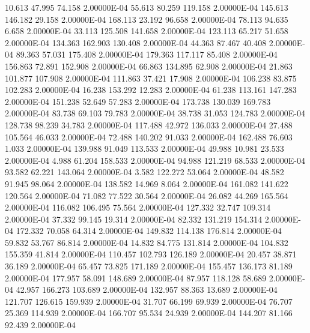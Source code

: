     10.613    47.995    74.158  2.00000E-04
    55.613    80.259   119.158  2.00000E-04
   145.613   146.182    29.158  2.00000E-04
   168.113    23.192    96.658  2.00000E-04
    78.113    94.635     6.658  2.00000E-04
    33.113   125.508   141.658  2.00000E-04
   123.113    65.217    51.658  2.00000E-04
   134.363   162.903   130.408  2.00000E-04
    44.363    87.467    40.408  2.00000E-04
    89.363    57.031   175.408  2.00000E-04
   179.363   117.117    85.408  2.00000E-04
   156.863    72.891   152.908  2.00000E-04
    66.863   134.895    62.908  2.00000E-04
    21.863   101.877   107.908  2.00000E-04
   111.863    37.421    17.908  2.00000E-04
   106.238    83.875   102.283  2.00000E-04
    16.238   153.292    12.283  2.00000E-04
    61.238   113.161   147.283  2.00000E-04
   151.238    52.649    57.283  2.00000E-04
   173.738   130.039   169.783  2.00000E-04
    83.738    69.103    79.783  2.00000E-04
    38.738    31.053   124.783  2.00000E-04
   128.738    98.239    34.783  2.00000E-04
   117.488    42.972   136.033  2.00000E-04
    27.488   105.564    46.033  2.00000E-04
    72.488   140.202    91.033  2.00000E-04
   162.488    76.603     1.033  2.00000E-04
   139.988    91.049   113.533  2.00000E-04
    49.988    10.981    23.533  2.00000E-04
     4.988    61.204   158.533  2.00000E-04
    94.988   121.219    68.533  2.00000E-04
    93.582    62.221   143.064  2.00000E-04
     3.582   122.272    53.064  2.00000E-04
    48.582    91.945    98.064  2.00000E-04
   138.582    14.969     8.064  2.00000E-04
   161.082   141.622   120.564  2.00000E-04
    71.082    77.522    30.564  2.00000E-04
    26.082    44.269   165.564  2.00000E-04
   116.082   106.495    75.564  2.00000E-04
   127.332    32.747   109.314  2.00000E-04
    37.332    99.145    19.314  2.00000E-04
    82.332   131.219   154.314  2.00000E-04
   172.332    70.058    64.314  2.00000E-04
   149.832   114.138   176.814  2.00000E-04
    59.832    53.767    86.814  2.00000E-04
    14.832    84.775   131.814  2.00000E-04
   104.832   155.359    41.814  2.00000E-04
   110.457   102.793   126.189  2.00000E-04
    20.457    38.871    36.189  2.00000E-04
    65.457    73.825   171.189  2.00000E-04
   155.457   136.173    81.189  2.00000E-04
   177.957    58.091   148.689  2.00000E-04
    87.957   118.128    58.689  2.00000E-04
    42.957   166.273   103.689  2.00000E-04
   132.957    88.363    13.689  2.00000E-04
   121.707   126.615   159.939  2.00000E-04
    31.707    66.199    69.939  2.00000E-04
    76.707    25.369   114.939  2.00000E-04
   166.707    95.534    24.939  2.00000E-04
   144.207    81.166    92.439  2.00000E-04
